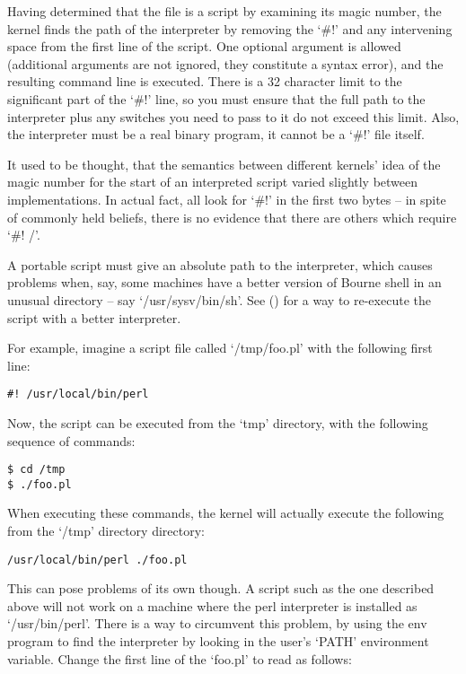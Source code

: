Having determined that the file is a script by examining its magic number, the kernel finds the path of the interpreter by removing the `\#!' and any intervening space from the first line of the script. One optional argument is allowed (additional arguments are not ignored, they constitute a syntax error), and the resulting command line is executed. There is a 32 character limit to the significant part of the `\#!' line, so you must ensure that the full path to the interpreter plus any switches you need to pass to it do not exceed this limit. Also, the interpreter must be a real binary program, it cannot be a `\#!' file itself.

It used to be thought, that the semantics between different kernels' idea of the magic number for the start of an interpreted script varied slightly between implementations. In actual fact, all look for `\#!' in the first two bytes -- in spite of commonly held beliefs, there is no evidence that there are others which require `\#! /'.

A portable script must give an absolute path to the interpreter, which causes problems when, say, some machines have a better version of Bourne shell in an unusual directory -- say `/usr/sysv/bin/sh'. See () for a way to re-execute the script with a better interpreter.

For example, imagine a script file called `/tmp/foo.pl' with the following first line: 

\begin{Verbatim}[frame=single]
#! /usr/local/bin/perl
\end{Verbatim}

Now, the script can be executed from the `tmp' directory, with the following sequence of commands:

\begin{Verbatim}[frame=single]
$ cd /tmp
$ ./foo.pl
\end{Verbatim}

When executing these commands, the kernel will actually execute the following from the `/tmp' directory directory:

\begin{Verbatim}[frame=single]
/usr/local/bin/perl ./foo.pl
\end{Verbatim}

This can pose problems of its own though. A script such as the one described 
above will not work on a machine where the perl interpreter is installed 
as `/usr/bin/perl'. There is a way to circumvent this problem, by using the 
env program to find the interpreter by looking in the user's `PATH' 
environment variable. Change the first line of the `foo.pl' to read as follows:

